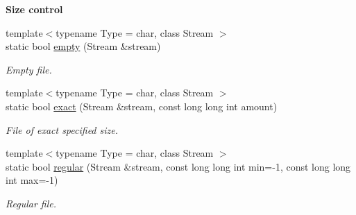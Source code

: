 \begin{Indent}{\bf Size control}\par
\begin{DoxyCompactItemize}
\item 
{\footnotesize template$<$typename Type  = char, class Stream $>$ }\\static bool \hyperlink{exceptionmagrathea_1_1FileSystem_aa5ab15c43fde776dea907791626dd923}{empty} (Stream \&stream)
\begin{DoxyCompactList}\small\item\em Empty file. \end{DoxyCompactList}\item 
{\footnotesize template$<$typename Type  = char, class Stream $>$ }\\static bool \hyperlink{exceptionmagrathea_1_1FileSystem_a1cd28f91dc3b950c9e66842a57717b74}{exact} (Stream \&stream, const long long int amount)
\begin{DoxyCompactList}\small\item\em File of exact specified size. \end{DoxyCompactList}\item 
{\footnotesize template$<$typename Type  = char, class Stream $>$ }\\static bool \hyperlink{exceptionmagrathea_1_1FileSystem_aa6b8ebf32ffef006ddd544f27ebaaca5}{regular} (Stream \&stream, const long long int min=-\/1, const long long int max=-\/1)
\begin{DoxyCompactList}\small\item\em Regular file. \end{DoxyCompactList}\end{DoxyCompactItemize}
\end{Indent}
